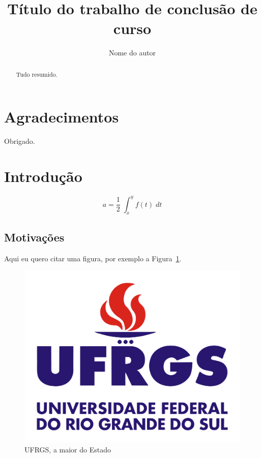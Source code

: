 \documentclass{automatex}
\title{Título do trabalho de conclusão de curso}
\author{Nome do autor}
\begin{document}
\maketitle

\setcounter{page}{1}

\tableofcontents

\section*{Agradecimentos}
Obrigado.
\newpage

\begin{abstract}
  Tudo resumido.
\end{abstract}
\newpage

\listoffigures
{}
\listoftables

\printglossary[type=\acronymtype,title=Lista de Abreviaturas e Siglas]
\printglossary[title=Lista de Simbolos]

\section{Introdução}

\setcounter{page}{1}

\lipsum[1-2]
\begin{equation}
  a = \dfrac{1}{2}\;\int_x^y f(t)\; dt
\end{equation}

\lipsum[24-26]

\subsection{Motivações}

Aqui eu quero citar uma figura, por exemplo a Figura~\ref{fig:ufrgs}.

\begin{figure}
  \centering
  \includegraphics[width=.4\textwidth]{imagens/logo_ufrgs}
  \caption{UFRGS, a maior do Estado}
  \label{fig:ufrgs}
\end{figure}
\end{document}
